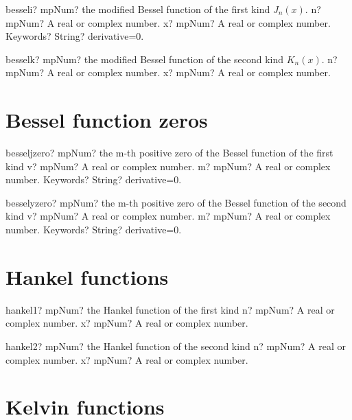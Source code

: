 \documentclass[12pt,a4paper,openany]{book}
\begin{document}
\begin{mpFunctionsExtract}
\mpFunctionThree
{besseli? mpNum? the modified Bessel function of the first kind $J_n(x)$.}
{n? mpNum? A real or complex number.}
{x? mpNum? A real or complex number.}
{Keywords? String? derivative=0.}
\end{mpFunctionsExtract}

\begin{mpFunctionsExtract}
\mpFunctionTwo
{besselk? mpNum? the modified Bessel function of the second kind $K_n(x)$.}
{n? mpNum? A real or complex number.}
{x? mpNum? A real or complex number.}
\end{mpFunctionsExtract}

\section{Bessel function zeros}

\begin{mpFunctionsExtract}
\mpFunctionThree
{besseljzero? mpNum? the m-th positive zero of the Bessel function of the first kind}
{v? mpNum? A real or complex number.}
{m? mpNum? A real or complex number.}
{Keywords? String? derivative=0.}
\end{mpFunctionsExtract}

\begin{mpFunctionsExtract}
\mpFunctionThree
{besselyzero? mpNum? the m-th positive zero of the Bessel function of the second kind}
{v? mpNum? A real or complex number.}
{m? mpNum? A real or complex number.}
{Keywords? String? derivative=0.}
\end{mpFunctionsExtract}

\section{Hankel functions}

\begin{mpFunctionsExtract}
\mpFunctionTwo
{hankel1? mpNum? the Hankel function of the first kind}
{n? mpNum? A real or complex number.}
{x? mpNum? A real or complex number.}
\end{mpFunctionsExtract}

\begin{mpFunctionsExtract}
\mpFunctionTwo
{hankel2? mpNum? the Hankel function of the second kind}
{n? mpNum? A real or complex number.}
{x? mpNum? A real or complex number.}
\end{mpFunctionsExtract}

\section{Kelvin functions}
\end{document}
